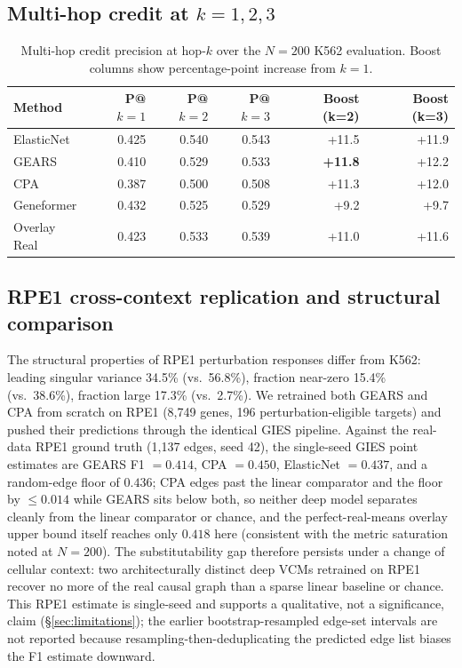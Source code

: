 \documentclass{article}
\theoremstyle{plain}
\theoremstyle{definition}
\theoremstyle{remark}
\begin{document}
\subsection{Multi-hop credit at $k = 1, 2, 3$}

\begin{table}[h]
\centering
\small
\begin{tabular}{lrrrrr}
\toprule
\textbf{Method} & \textbf{P@$k{=}1$} & \textbf{P@$k{=}2$} & \textbf{P@$k{=}3$} & \textbf{Boost (k=2)} & \textbf{Boost (k=3)} \\
\midrule
ElasticNet  & 0.425 & 0.540 & 0.543 & +11.5 & +11.9 \\
GEARS       & 0.410 & 0.529 & 0.533 & \textbf{+11.8} & +12.2 \\
CPA         & 0.387 & 0.500 & 0.508 & +11.3 & +12.0 \\
Geneformer  & 0.432 & 0.525 & 0.529 & +9.2  & +9.7  \\
Overlay Real & 0.423 & 0.533 & 0.539 & +11.0 & +11.6 \\
\bottomrule
\end{tabular}
\caption{Multi-hop credit precision at hop-$k$ over the $N{=}200$ K562 evaluation. Boost columns show percentage-point increase from $k{=}1$.}
\end{table}

\subsection{RPE1 cross-context replication and structural comparison}
\label{app:rpe1}
The structural properties of RPE1 perturbation responses differ from K562: leading singular variance 34.5\% (vs.\ 56.8\%), fraction near-zero 15.4\% (vs.\ 38.6\%), fraction large 17.3\% (vs.\ 2.7\%). We retrained both GEARS and CPA from scratch on RPE1 (8{,}749 genes, 196 perturbation-eligible targets) and pushed their predictions through the identical GIES pipeline. Against the real-data RPE1 ground truth (1{,}137 edges, seed 42), the single-seed GIES point estimates are GEARS F1 $= 0.414$, CPA $= 0.450$, ElasticNet $= 0.437$, and a random-edge floor of $0.436$; CPA edges past the linear comparator and the floor by $\leq 0.014$ while GEARS sits below both, so neither deep model separates cleanly from the linear comparator or chance, and the perfect-real-means overlay upper bound itself reaches only $0.418$ here (consistent with the metric saturation noted at $N{=}200$). The substitutability gap therefore persists under a change of cellular context: two architecturally distinct deep VCMs retrained on RPE1 recover no more of the real causal graph than a sparse linear baseline or chance. This RPE1 estimate is single-seed and supports a qualitative, not a significance, claim (\S\ref{sec:limitations}); the earlier bootstrap-resampled edge-set intervals are not reported because resampling-then-deduplicating the predicted edge list biases the F1 estimate downward.
\end{document}
